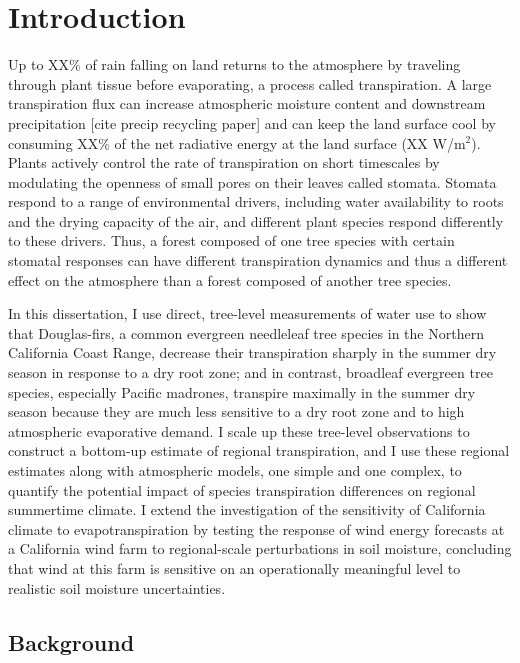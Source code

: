 \chapter{Introduction}
\label{c.intro}

Up to XX\% of rain falling on land returns to the atmosphere by traveling through plant tissue before evaporating, a process called transpiration.  A large transpiration flux can increase atmospheric moisture content and downstream precipitation [cite precip recycling paper] and can keep the land surface cool by consuming XX\% of the net radiative energy at the land surface (XX W/m$^2$).  Plants actively control the rate of transpiration on short timescales by modulating the openness of small pores on their leaves called stomata.  Stomata respond to a range of environmental drivers, including water availability to roots and the drying capacity of the air, and different plant species respond differently to these drivers.  Thus, a forest composed of one tree species with certain stomatal responses can have different transpiration dynamics and thus a different effect on the atmosphere than a forest composed of another tree species.  

In this dissertation, I use direct, tree-level measurements of water use to show that Douglas-firs, a common evergreen needleleaf tree species in the Northern California Coast Range, decrease their transpiration sharply in the summer dry season in response to a dry root zone; and in contrast, broadleaf evergreen tree species, especially Pacific madrones, transpire maximally in the summer dry season because they are much less sensitive to a dry root zone and to high atmospheric evaporative demand.  I scale up these tree-level observations to construct a bottom-up estimate of regional transpiration, and I use these regional estimates along with atmospheric models, one simple and one complex, to quantify the potential impact of species transpiration differences on regional summertime climate.  I extend the investigation of the sensitivity of California climate to evapotranspiration by testing the response of wind energy forecasts at a California wind farm to regional-scale perturbations in soil moisture, concluding that wind at this farm is sensitive on an operationally meaningful level to realistic soil moisture uncertainties.

\section{Background}

